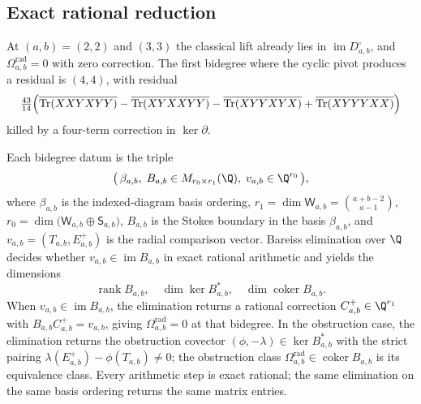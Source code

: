 \subsection*{Exact rational reduction}\label{ssec:app-radial-rational-reduction}

\begin{ex}\label{ex:app-radial-first-balanced-residual}
  At \((a,b)=(2,2)\) and \((3,3)\) the classical lift already lies in
  \(\operatorname{im} D^\square_{a,b}\), and
  \(\Omega^{\mathrm{rad}}_{a,b}=0\) with zero correction.  The first
  bidegree where the cyclic pivot produces a residual is \((4,4)\),
  with residual
  \[
    \tfrac{43}{14}
      \Bigl(
        \overline{\operatorname{Tr}(XXYXYY)}
        -\overline{\operatorname{Tr}(XYXXYY)}
        -\overline{\operatorname{Tr}(XYYXYX)}
        +\overline{\operatorname{Tr}(XYYYXX)}
      \Bigr)
  \]
  killed by a four-term correction in \(\ker\partial\).
\end{ex}

\begin{thm}\label{thm:app-radial-bidegree-rational-reduction}
  Each bidegree datum is the triple
  \[
    \bigl(\,
        \beta_{a,b},\;
        B_{a,b}\in M_{r_0\times r_1}(\Q),\;
        v_{a,b}\in\Q^{r_0}
      \,\bigr),
  \]
  where \(\beta_{a,b}\) is the indexed-diagram basis ordering,
  \(r_1=\dim\mathsf W_{a,b}=\binom{a+b-2}{a-1}\),
  \(r_0=\dim\bigl(\mathsf W_{a,b}\oplus\mathsf S_{a,b}\bigr)\),
  \(B_{a,b}\) is the Stokes boundary in the basis \(\beta_{a,b}\), and
  \(v_{a,b}=(T_{a,b},E^+_{a,b})\) is the radial comparison vector.
  Bareiss elimination over \(\Q\) decides whether
  \(v_{a,b}\in\operatorname{im}B_{a,b}\) in exact rational
  arithmetic and yields the dimensions
  \[
    \operatorname{rank}B_{a,b},\quad
    \dim\ker B_{a,b}^*,\quad
    \dim\operatorname{coker}B_{a,b}.
  \]
  When \(v_{a,b}\in\operatorname{im}B_{a,b}\), the elimination returns
  a rational correction
  \(C^+_{a,b}\in\Q^{r_1}\) with
  \(B_{a,b}C^+_{a,b}=v_{a,b}\), giving
  \(\Omega^{\mathrm{rad}}_{a,b}=0\) at that bidegree.  In the obstruction
  case, the elimination returns the obstruction covector
  \((\phi,-\lambda)\in\ker B_{a,b}^*\) with the strict pairing
  \(\lambda(E^+_{a,b})-\phi(T_{a,b})\ne0\); the obstruction class
  \(\Omega^{\mathrm{rad}}_{a,b}\in\operatorname{coker}B_{a,b}\) is its
  equivalence class.  Every arithmetic step is exact rational; the
  same elimination on the same basis ordering returns the same
  matrix entries.
\end{thm}

